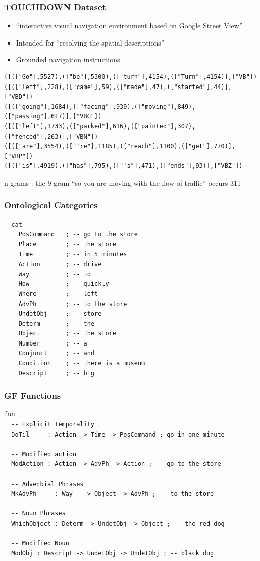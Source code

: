\documentclass{beamer}
\begin{document}
\begin{frame}[fragile]
\frametitle{TOUCHDOWN Dataset}
\fontsize{8pt}{9pt}\selectfont
\begin{block}{}
\begin{itemize}[<+->]
\item ``interactive visual navigation environment based on Google Street View''
\item Intended for ``resolving the spatial descriptions''
\item Grounded navigation instructions
\end{itemize}
\end{block}
\pause
\begin{verbatim}
([(["Go"],5527),(["be"],5300),(["turn"],4154),(["Turn"],4154)],["VB"])
([(["left"],228),(["came"],59),(["made"],47),(["started"],44)],["VBD"])
([(["going"],1684),(["facing"],939),(["moving"],849),(["passing"],617)],["VBG"])
([(["left"],1733),(["parked"],616),(["painted"],307),(["fenced"],263)],["VBN"])
([(["are"],3554),(["'re"],1185),(["reach"],1100),(["get"],770)],["VBP"])
([(["is"],4919),(["has"],795),(["'s"],471),(["ends"],93)],["VBZ"])
\end{verbatim}

\pause
\begin{exampleblock}{}
n-grams : the 9-gram ``so you are moving with the flow of traffic'' occurs 311
\end{exampleblock}

\end{frame}



\begin{frame}[fragile]
\frametitle{Ontological Categories}
\begin{verbatim}
  cat
    PosCommand   ; -- go to the store
    Place        ; -- the store
    Time         ; -- in 5 minutes
    Action       ; -- drive
    Way          ; -- to
    How          ; -- quickly
    Where        ; -- left
    AdvPh        ; -- to the store
    UndetObj     ; -- store
    Determ       ; -- the
    Object       ; -- the store
    Number       ; -- a
    Conjunct     ; -- and
    Condition    ; -- there is a museum
    Descript     ; -- big
\end{verbatim}
\end{frame}

\begin{frame}[fragile]
\frametitle{GF Functions}
\begin{verbatim}
fun
  -- Explicit Temporality
  DoTil     : Action -> Time -> PosCommand ; go in one minute

  -- Modified action
  ModAction : Action -> AdvPh -> Action ; -- go to the store

  -- Adverbial Phrases
  MkAdvPh     : Way   -> Object -> AdvPh ; -- to the store

  -- Noun Phrases
  WhichObject : Determ -> UndetObj -> Object ; -- the red dog

  -- Modified Noun
  ModObj : Descript -> UndetObj -> UndetObj ; -- black dog
\end{verbatim}
\end{frame}
\end{document}
